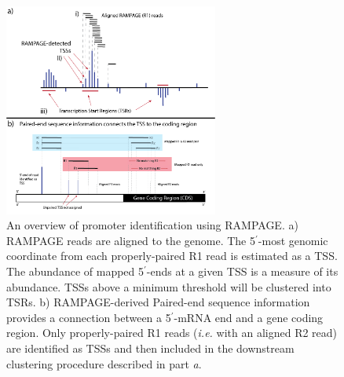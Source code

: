 \documentclass[runningheads,a4paper]{llncs}
\begin{document}
\begin{linenumbers}
\begin{figure}
\centering
\includegraphics[height=7cm]{Figures/Insect_Chapter_Figure_2.png}
\caption{An overview of promoter identification using RAMPAGE. a) RAMPAGE reads are aligned to the genome. The 5$^\prime$-most genomic coordinate from each properly-paired R1 read is estimated as a TSS. The abundance of mapped 5$^\prime$-ends at a given TSS is a measure of its abundance. TSSs above a minimum threshold will be clustered into TSRs. b) RAMPAGE-derived Paired-end sequence information provides a connection between a 5$^\prime$-mRNA end and a gene coding region. Only properly-paired R1 reads (\textit{i.e.} with an aligned R2 read) are identified as TSSs and then included in the downstream clustering procedure described in part \textit{a}.}
\label{fig:figure2}
\end{figure}


\end{linenumbers}
\end{document}
